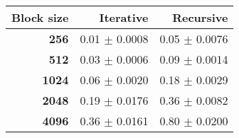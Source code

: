 \begin{tabular}{rrr}\toprule
\textbf{Block size}  & \textbf{Iterative} & \textbf{Recursive}\\\midrule
\textbf{256}  & 0.01 $\pm$ 0.0008 & 0.05 $\pm$ 0.0076\\
\textbf{512}  & 0.03 $\pm$ 0.0006 & 0.09 $\pm$ 0.0014\\
\textbf{1024}  & 0.06 $\pm$ 0.0020 & 0.18 $\pm$ 0.0029\\
\textbf{2048}  & 0.19 $\pm$ 0.0176 & 0.36 $\pm$ 0.0082\\
\textbf{4096} & 0.36 $\pm$ 0.0161 & 0.80 $\pm$ 0.0200\\
\bottomrule
\end{tabular}
